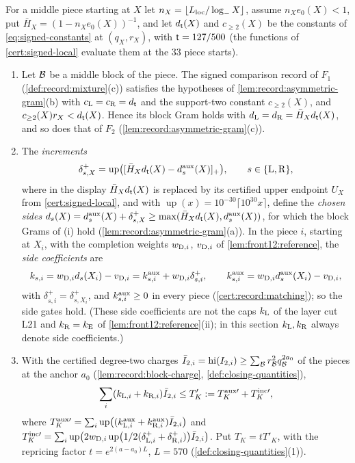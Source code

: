 \begin{proposition}\label{prop:signed-sides}
For a middle piece starting at $X$ let $n_X=\lfloor L_{\rm loc}/\log_-X\rfloor$,
assume $n_Xe_0(X)<1$, put $\bar H_X=(1-n_Xe_0(X))^{-1}$, and let $d_\tlaw(X)$ and
$c_{\ge2}(X)$ be the constants of \eqref{eq:signed-constants} at $(q_X,r_X)$, with
$\tlaw=127/500$ (the functions of \cref{cert:signed-local} evaluate them at the
$33$ piece starts).
\begin{enumerate}[label=(\roman*)]
\item Let $\Blk$ be a middle block of the piece. The signed comparison record of
 $F_1$ (\cref{def:record:mixture}(c)) satisfies the hypotheses of
 \cref{lem:record:asymmetric-gram}(b) with $c_{\rm L}=c_{\rm R}=d_\tlaw$ and the
 support-two constant $c_{\ge2}(X)$, and $c_{\ge2}(X)r_X<d_\tlaw(X)$. Hence its block
 Gram holds with $d_{\rm L}=d_{\rm R}=\bar H_Xd_\tlaw(X)$, and so does that of $F_2$
 (\cref{lem:record:asymmetric-gram}(c)).
\item The \emph{increments}
 \begin{equation}\label{eq:signed-increment}
  \delta^+_{s,X}=\operatorname{up}\bigl([\bar H_Xd_\tlaw(X)-d^{\rm aux}_s(X)]_+\bigr),
  \qquad s\in\{{\rm L},{\rm R}\},
 \end{equation}
 where in the display $\bar H_Xd_\tlaw(X)$ is replaced by its certified upper endpoint $U_X$ from \cref{cert:signed-local}, and with
 $\operatorname{up}(x)=10^{-30}\lceil10^{30}x\rceil$, define the \emph{chosen sides}
 $d_s(X)=d^{\rm aux}_s(X)+\delta^+_{s,X}\ge\max(\bar H_Xd_\tlaw(X),d^{\rm aux}_s(X))$,
 for which the block Grams of (i) hold (\cref{lem:record:asymmetric-gram}(a)). In
 the piece $i$, starting at $X_i$, with the completion weights $w_{{\rm D},i}$,
 $v_{{\rm D},i}$ of \cref{lem:front12:reference}, the \emph{side coefficients}
 are
 \[
  k_{s,i}=w_{{\rm D},i}d_s(X_i)-v_{{\rm D},i}=k^{\rm aux}_{s,i}+w_{{\rm D},i}\delta^+_{s,i},
  \qquad k^{\rm aux}_{s,i}=w_{{\rm D},i}d^{\rm aux}_s(X_i)-v_{{\rm D},i},
 \]
 with $\delta^+_{s,i}=\delta^+_{s,X_i}$, and $k^{\rm aux}_{s,i}\ge0$ in every piece
 (\cref{cert:record:matching}); so the side gates hold. (These side coefficients
 are not the caps $k_{\rm L}$ of the layer cut L21 and $k_{\rm R}=k_{\rm E}$ of
 \cref{lem:front12:reference}(ii); in this section $k_{\rm L},k_{\rm R}$ always
 denote side coefficients.)
\item With the certified degree-two charges
 $\bar I_{2,i}=\operatorname{hi}(I_{2,i})\ge\sum_\Blk r_\Blk^2q_\Blk^{2a_0}$ of the pieces at
 the anchor $a_0$ (\cref{lem:record:block-charge}, \cref{def:closing-quantities}),
 \[
  \sum_i(k_{{\rm L},i}+k_{{\rm R},i})\bar I_{2,i}\le T'_K:=T^{\rm aux\prime}_K+T^{\rm inc\prime}_K,
 \]
 where $T^{\rm aux\prime}_K=\sum_i\operatorname{up}\bigl((k^{\rm aux}_{{\rm L},i}
 +k^{\rm aux}_{{\rm R},i})\bar I_{2,i}\bigr)$ and $T^{\rm inc\prime}_K=\sum_i
 \operatorname{up}\bigl(2w_{{\rm D},i}\operatorname{up}\bigl(\frac12(\delta^+_{{\rm L},i}
 +\delta^+_{{\rm R},i})\bigr)\bar I_{2,i}\bigr)$. Put $T_K=tT'_K$, with the repricing
 factor $t=e^{2(a-a_0)L}$, $L=570$ (\cref{def:closing-quantities}(1)).
\end{enumerate}
\end{proposition}

